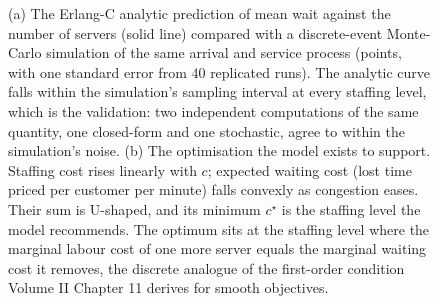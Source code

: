 \begin{figure}[htbp]
\caption[Queue model: validation against simulation and the staffing
optimum]{(a) The Erlang-C analytic prediction of mean wait against the
number of servers (solid line) compared with a discrete-event Monte-Carlo
simulation of the same arrival and service process (points, with one
standard error from $40$ replicated runs). The analytic curve falls
within the simulation's sampling interval at every staffing level, which
is the validation: two independent computations of the same quantity, one
closed-form and one stochastic, agree to within the simulation's noise.
(b) The optimisation the model exists to support. Staffing cost rises
linearly with $c$; expected waiting cost (lost time priced per customer
per minute) falls convexly as congestion eases. Their sum is U-shaped,
and its minimum $c^\star$ is the staffing level the model recommends. The
optimum sits at the staffing level where the marginal labour cost of one
more server equals the marginal waiting cost it removes, the discrete
analogue of the first-order condition Volume II Chapter 11 derives for
smooth objectives.}
\label{fig:vol02:ch18:queue-validation}
\end{figure}
